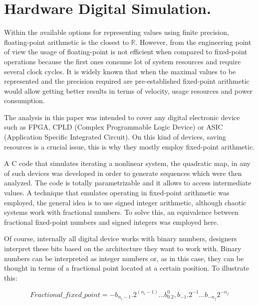 \section{Hardware Digital Simulation.} \label{sec:repre}

Within the available options for representing values using finite precision, floating-point arithmetic is the closest to $\mathbb{R}$. However, from the engineering point of view the usage of floating-point is not efficient when compared to fixed-point operations because the first ones consume lot of system resources and require several clock cycles. It is widely known that when the maximal values to be represented and the precision required are pre-established fixed-point arithmetic would allow getting better results in terms of velocity, usage resources and power consumption.

The analysis in this paper was intended to cover any digital electronic device such as FPGA, CPLD (Complex Programmable Logic Device) or ASIC (Application Specific Integrated Circuit). On this kind of devices, saving resources is a crucial issue, this is why they mostly employ fixed-point arithmetic. 

A C code that simulates iterating a nonlinear system, the quadratic map, in any of such devices was developed in order to generate sequences which were then analyzed.
The code is totally parametrizable and it allows to access intermediate values.
A technique that emulates operating in fixed-point arithmetic was employed, the general idea is to use signed integer arithmetic, although chaotic systems work with fractional numbers. To solve this, an equivalence
between fractional fixed-point numbers and signed integers was employed here.

Of course, internally all digital device works with binary numbers, designers interpret these bits based on the architecture they want to work with. 
Binary numbers can be interpreted as integer numbers or, as in this case, they can be thought in terms of a fractional point located at a certain position. To illustrate this:

\begin{equation}\label{eq:eqdecimal}
Fractional\_fixed\_point=-b_{n_i-1}.2^{(n_i-1)} \dots b_0.2^0,b_{-1}.2^{-1} \dots b_{-n_f}2^{-n_f}
\end{equation}

